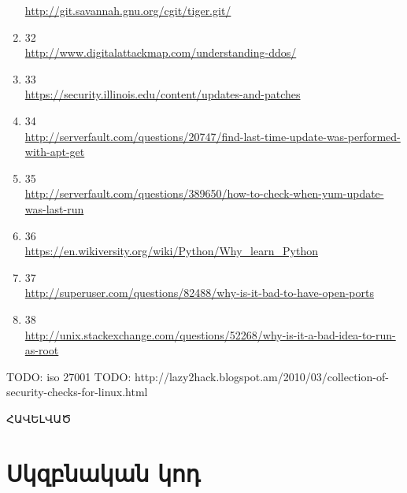 \documentclass[12pt]{article}
\begin{document}
\begin{sloppypar}
\begin{enumerate}
	\url{http://git.savannah.gnu.org/cgit/tiger.git/}
\item 32 \\
	\url{http://www.digitalattackmap.com/understanding-ddos/}
\item 33 \\
	\url{https://security.illinois.edu/content/updates-and-patches}
\item 34 \\
	\url{http://serverfault.com/questions/20747/find-last-time-update-was-performed-with-apt-get}
\item 35 \\
	\url{http://serverfault.com/questions/389650/how-to-check-when-yum-update-was-last-run}
\item 36 \\
	\url{https://en.wikiversity.org/wiki/Python/Why\_learn\_Python}
\item 37 \\
	\url{http://superuser.com/questions/82488/why-is-it-bad-to-have-open-ports}
\item 38 \\
	\url{http://unix.stackexchange.com/questions/52268/why-is-it-a-bad-idea-to-run-as-root}
\end{enumerate}


TODO: iso 27001
TODO: http://lazy2hack.blogspot.am/2010/03/collection-of-security-checks-for-linux.html




\newpage
\vspace*{\fill}
\begingroup
\centering
\centerline{\Huge{ՀԱՎԵԼՎԱԾ}}
\endgroup
\vspace*{\fill}
\newpage


\section*{Սկզբնական կոդ}






















\end{sloppypar}
\end{document}
